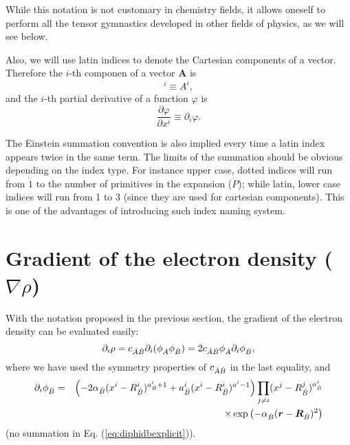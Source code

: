 While this notation is not customary in chemistry fields, it allows oneself to perform all the tensor gymnastics developed in other fields of physics, as we will see below.

Also, we will use latin indices to denote the Cartesian components of a vector. Therefore the $i$-th componen of a vector $\boldsymbol{A}$ is
%
\begin{equation}
   [\boldsymbol{A}]^{i}\equiv A^i,
\end{equation}
%
and the $i$-th partial derivative of a function $\varphi$ is
%
\begin{equation}
   \frac{\partial\varphi}{\partial x^i}\equiv\partial_i\varphi.
\end{equation}
%

The Einstein summation convention is also implied every time a latin index appears twice in the same term. The limits of the summation should be obvious depending on the index type. For instance upper case, dotted indices will run from $\dot{1}$ to the number of primitives in the expansion ($\dot{P}$); while latin, lower case indices will run from 1 to 3 (since they are used for cartesian components). This is one of the advantages of introducing such index naming system.


\section{Gradient of the electron density ($\nabla\rho$)}\label{sec:gradrho}

With the notation proposed in the previous section, the gradient of the electron density can be evaluated easily:
%
\begin{equation}
   \partial_i\rho=c_{\dot{A}\dot{B}}\partial_i(\phi_{\dot{A}}\phi_{\dot{B}})=2c_{\dot{A}\dot{B}}\phi_{\dot{A}}\partial_i\phi_{\dot{B}},
\end{equation}
%
where we have used the symmetry properties of $c_{\dot{A}\dot{B}}$ in the last equality, and
%
\begin{eqnarray}
   \partial_i\phi_{\dot{B}}&=&\left(-2\alpha_{\dot{B}}(x^i-R^i_{\dot{B}})^{a^i_{\dot{B}}+1}+a^i_{\dot{B}}(x^i-R^i_{\dot{B}})^{a^i-1}\right)\prod_{j\neq i}(x^j-R^j_{\dot{B}})^{a^j_{\dot{B}}}\nonumber\\
                       & &\times\exp\left(-\alpha_{\dot{B}}(\boldsymbol{r}-\boldsymbol{R}_{\dot{B}})^2\right)
                       \label{eq:diphidbexplicit}
\end{eqnarray}
%
(no summation in Eq. (\ref{eq:diphidbexplicit})).

